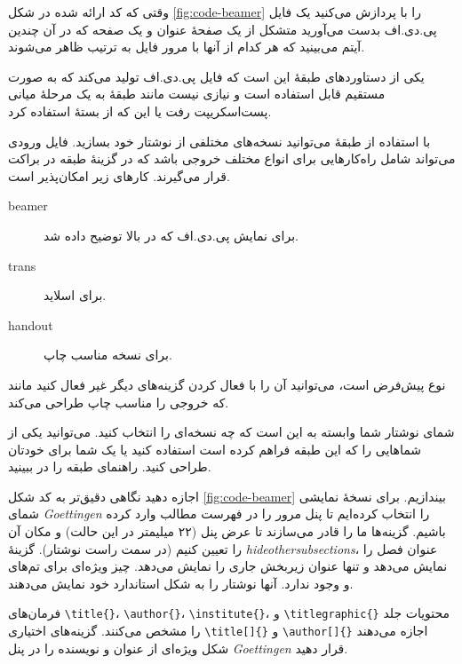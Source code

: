وقتی که کد ارائه شده در شکل 
\ref{fig:code-beamer} 
را با  
 پردازش می‌کنید یک فایل پی.دی.اف بدست می‌آورید متشکل از یک صفحهٔ عنوان و یک صفحه که در آن چندین آیتم می‌بینید که هر کدام از آنها با مرور فایل به ترتیب ظاهر می‌شوند.

یکی از دستاوردهای طبقهٔ   این است که فایل پی.دی.اف تولید می‌کند که به صورت مستقیم قابل استفاده است و نیازی نیست مانند  طبقهٔ  به یک مرحلهٔ میانی پست‌اسکریپت رفت یا این که از بستهٔ   استفاده کرد.

با استفاده از طبقهٔ  می‌توانید نسخه‌های مختلفی از نوشتار‌ خود بسازید. فایل ورودی می‌تواند شامل راه‌کارهایی برای انواع مختلف خروجی باشد که در گزینهٔ طبقه در براکت قرار می‌گیرند. کارهای زیر امکان‌پذیر است.

\begin{description}
\item[beamer] برای نمایش پی.دی.اف که در بالا توضیح داده شد.
\item[trans] برای اسلاید.
\item[handout] برای نسخه مناسب چاپ.
\end{description}
نوع پیش‌فرض  است، می‌توانید آن را با فعال کردن گزینه‌های دیگر غیر فعال کنید مانند
 که خروجی را مناسب چاپ طراحی می‌کند.

شمای نوشتار‌ شما وابسته به این است که چه نسخه‌ای را انتخاب کنید. می‌توانید یکی از شماهایی را که این طبقه فراهم کرده است استفاده کنید یا یک شما برای خودتان طراحی کنید. راهنمای طبقه را در  ببینید.

اجازه دهید نگاهی دقیق‌تر به کد شکل 
\ref{fig:code-beamer} 
بیندازیم.
برای نسخهٔ نمایشی   شمای \emph{Goettingen} را انتخاب کرده‌ایم تا پنل مرور را در فهرست مطالب وارد کرده باشیم. گزینه‌ها ما را قادر می‌سازند تا عرض پنل 
 (۲۲ میلیمتر در این حالت) 
 و مکان آن را تعیین کنیم  (در سمت راست نوشتار‌). گزینهٔ 
 \emph{hideothersubsections}، عنوان فصل را نمایش می‌دهد و تنها عنوان زیربخش جاری را نمایش می‌دهد. چیز ویژه‌ای برای تم‌های    و  وجود ندارد. آنها نوشتار‌ را به شکل استاندارد خود نمایش می‌دهند.

فرمان‌های \verb|\title{}|، \verb|\author{}|، \verb|\institute{}|،
 و \verb|\titlegraphic{}| محتویات جلد را مشخص می‌کنند. گزینه‌های اختیاری  \verb|\title[]{}|  و \verb|\author[]{}|
اجازه می‌دهند شکل ویژه‌ای از عنوان و نویسنده را در پنل  
\emph{Goettingen} 
قرار دهید.

